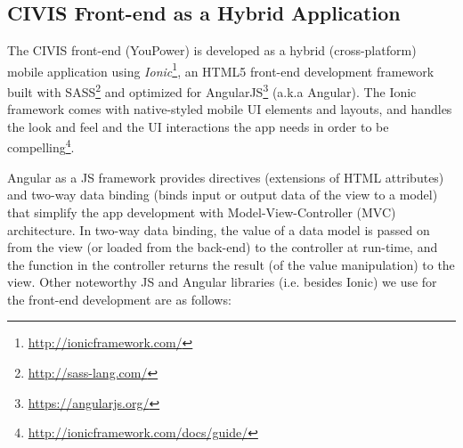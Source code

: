 \subsection{CIVIS Front-end as a Hybrid Application} 

The CIVIS front-end (YouPower) is developed as a hybrid (cross-platform) mobile application using \textit{Ionic}\footnote{\url{http://ionicframework.com/}}, an HTML5 front-end development framework built with SASS\footnote{\url{http://sass-lang.com/}} and optimized for AngularJS\footnote{\url{https://angularjs.org/}} (a.k.a Angular). 
% 
The Ionic framework comes with native-styled mobile UI elements and layouts, and handles the look and feel and the UI interactions the app needs in order to be compelling\footnote{\url{http://ionicframework.com/docs/guide/}}. 

Angular as a JS framework provides directives (extensions of HTML attributes) and two-way data binding (binds input or output data of the view to a model) that simplify the app development with Model-View-Controller (MVC) architecture. 
In two-way data binding, the value of a data model is passed on from the view (or loaded from the back-end) to the controller at run-time, and the function in the controller returns the result (of the value manipulation) to the view. 
% 
Other noteworthy JS and Angular libraries (i.e. besides Ionic) we use for the front-end development are as follows:

